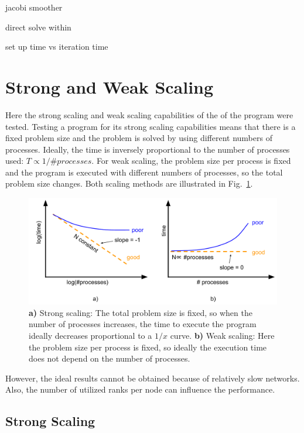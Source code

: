 jacobi smoother


direct solve within

set up time vs iteration time

\newpage
\section{Strong and Weak Scaling}

Here the strong scaling and weak scaling capabilities of the of the program were tested. Testing a program for its strong scaling capabilities means that there is a fixed problem size and the problem is solved by using different numbers of processes. Ideally, the time is inversely proportional to the number of processes used: $T \propto 1/\textit{\#processes}$. For weak scaling, the problem size per process is fixed and the program is executed with different numbers of processes, so the total problem size changes. Both scaling methods are illustrated in Fig.~\ref{fig:strong_weak_scaling}.


\begin{figure}[tb]
	\centering
\hspace*{-7mm}	\includegraphics[width=1.\textwidth]{4_strong_weak_scaling}
	\caption{\textbf{a)} Strong scaling: The total problem size is fixed, so when the number of processes increases, the time to execute the program ideally decreases proportional to a $1/x$ curve. \textbf{b)} Weak scaling: Here the problem size per process is fixed, so ideally the execution time does not depend on the number of processes.}
	\label{fig:strong_weak_scaling}
\end{figure}

However, the ideal results cannot be obtained because of relatively slow networks. Also, the number of utilized ranks per node can influence the performance.

\subsection{Strong Scaling}



